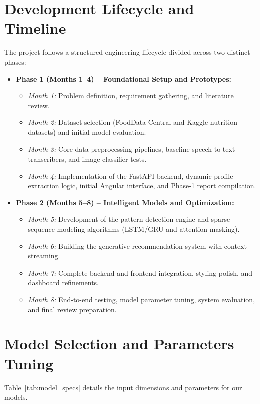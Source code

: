 \documentclass[12pt,a4paper,oneside]{report}
\begin{document}
\section{Development Lifecycle and Timeline}
The project follows a structured engineering lifecycle divided across two distinct phases:
\begin{itemize}
    \item \textbf{Phase 1 (Months 1--4) -- Foundational Setup and Prototypes:}
    \begin{itemize}
        \item \textit{Month 1:} Problem definition, requirement gathering, and literature review.
        \item \textit{Month 2:} Dataset selection (FoodData Central and Kaggle nutrition datasets) and initial model evaluation.
        \item \textit{Month 3:} Core data preprocessing pipelines, baseline speech-to-text transcribers, and image classifier tests.
        \item \textit{Month 4:} Implementation of the FastAPI backend, dynamic profile extraction logic, initial Angular interface, and Phase-1 report compilation.
    \end{itemize}
    \item \textbf{Phase 2 (Months 5--8) -- Intelligent Models and Optimization:}
    \begin{itemize}
        \item \textit{Month 5:} Development of the pattern detection engine and sparse sequence modeling algorithms (LSTM/GRU and attention masking).
        \item \textit{Month 6:} Building the generative recommendation system with context streaming.
        \item \textit{Month 7:} Complete backend and frontend integration, styling polish, and dashboard refinements.
        \item \textit{Month 8:} End-to-end testing, model parameter tuning, system evaluation, and final review preparation.
    \end{itemize}
\end{itemize}

\section{Model Selection and Parameters Tuning}
Table~\ref{tab:model_specs} details the input dimensions and parameters for our models.
\end{document}
